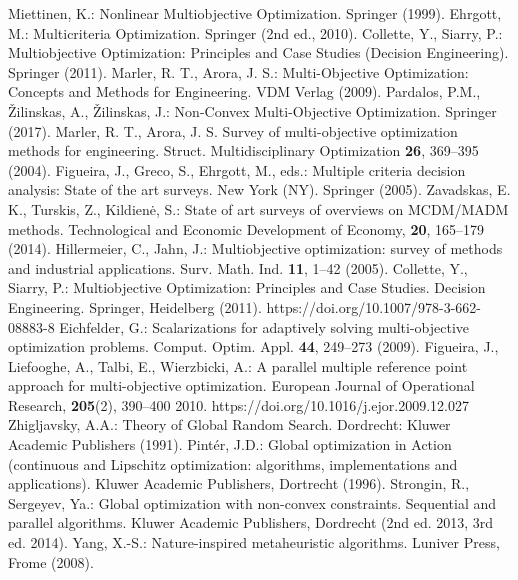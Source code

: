 \documentclass[runningheads]{llncs}
\begin{document}
\begin{thebibliography}{1}
\providecommand{\url}[1]{\texttt{#1}}
\providecommand{\urlprefix}{URL }
\providecommand{\doi}[1]{https://doi.org/#1}

 Miettinen, K.: Nonlinear Multiobjective Optimization. Springer (1999).
 Ehrgott, M.: Multicriteria Optimization. Springer (2nd ed., 2010).
 Collette, Y., Siarry, P.:  Multiobjective Optimization: Principles and Case Studies (Decision Engineering). Springer (2011).
 Marler, R. T., Arora, J. S.: Multi-Objective Optimization: Concepts and Methods for Engineering. VDM Verlag (2009).
 Pardalos, P.M., {\v Z}ilinskas, A., {\v Z}ilinskas, J.: Non-Convex Multi-Objective Optimization. Springer (2017).
 Marler, R. T., Arora, J. S. Survey of multi-objective optimization methods for engineering. Struct. Multidisciplinary Optimization \textbf{26}, 369--395 (2004).
  Figueira, J., Greco, S., Ehrgott, M., eds.: Multiple criteria decision analysis: State of the art surveys. New York (NY). Springer (2005).
 Zavadskas, E. K., Turskis, Z., Kildien{\. e}, S.: State of art surveys of overviews on MCDM/MADM methods. Technological and Economic Development of Economy, \textbf{20}, 165--179 (2014).
 Hillermeier, C., Jahn, J.: Multiobjective optimization: survey of methods and industrial applications. Surv. Math. Ind. \textbf{11}, 1--42 (2005).
 Collette, Y., Siarry, P.: Multiobjective Optimization: Principles and Case Studies. Decision Engineering. Springer, Heidelberg (2011). \doi{10.1007/978-3-662-08883-8}
 Eichfelder, G.: Scalarizations for adaptively solving multi-objective optimization problems. Comput. Optim. Appl. \textbf{44}, 249--273 (2009).
 Figueira, J., Liefooghe, A., Talbi, E., Wierzbicki, A.: A parallel multiple reference point approach for multi-objective optimization. European Journal of Operational Research, \textbf{205}(2), 390--400 2010. \doi{10.1016/j.ejor.2009.12.027}
 Zhigljavsky, A.A.: Theory of Global Random Search. Dordrecht: Kluwer Academic Publishers (1991).
 Pint{\' e}r, J.D.: Global optimization in Action (continuous and Lipschitz optimization: algorithms, implementations and applications). Kluwer Academic Publishers, Dortrecht (1996).
 Strongin, R., Sergeyev, Ya.: Global optimization with non-convex constraints. Sequential and parallel algorithms. Kluwer Academic Publishers, Dordrecht (2nd ed. 2013, 3rd ed. 2014).
 Yang, X.-S.: Nature-inspired metaheuristic algorithms. Luniver Press, Frome (2008).

\end{thebibliography}
\end{document}
